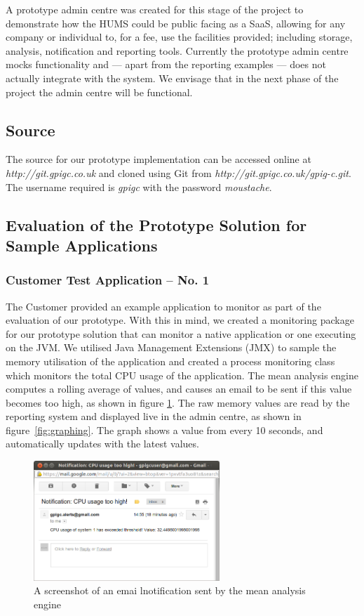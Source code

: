 \documentclass[10pt,a4paper]{article}
\begin{document}

A prototype admin centre was created for this stage of the project to demonstrate how the HUMS could be public facing as a SaaS, allowing for any company or individual to, for a fee, use the facilities provided; including storage, analysis, notification and reporting tools. Currently the prototype admin centre mocks functionality and --- apart from the reporting examples --- does not actually integrate with the system. We envisage that in the next phase of the project the admin centre will be functional.

\subsection{Source}
The source for our prototype implementation can be accessed online at \textit{http://git.gpigc.co.uk} and cloned using Git from \textit{http://git.gpigc.co.uk/gpig-c.git}. The username required is \textit{gpigc} with the password \textit{moustache}.

\subsection{Evaluation of the Prototype Solution for Sample Applications}
\label{sec:prototype-evaluation}

\subsubsection{Customer Test Application -- No. 1}
The Customer provided an example application to monitor as part of the
evaluation of our prototype. With this in mind, we created a monitoring 
package for our prototype solution that can monitor a native application
or one executing on the JVM. We utilised Java Management 
Extensions (JMX) to sample the memory utilisation of the application and
created a process monitoring class which monitors the total
CPU usage of the application. The mean analysis engine computes a 
rolling average of values, and causes an email to be sent if this value
becomes too high, as shown in figure \ref{fig:alerting}. The raw memory
values are read by the reporting system and displayed live in the admin
centre, as shown in figure~\ref{fig:graphing}. The graph shows a value from
every 10 seconds, and automatically updates with the latest values.


\begin{figure}[htbp!]
  \centering
  \includegraphics[width=7cm]{images/TestApplicationCPUAlert.png}
  \caption{A screenshot of an emai lnotification sent by the mean analysis engine}
  \label{fig:alerting}
\end{figure}
\end{document}
